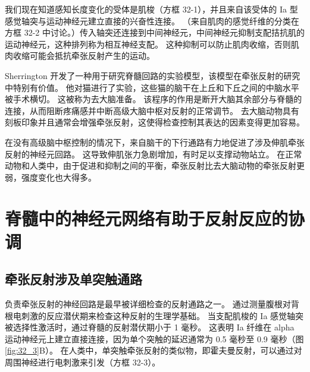 我们现在知道感知长度变化的受体是肌梭（方框 32-1），并且来自该受体的 Ia 型感觉轴突与运动神经元建立直接的兴奋性连接。 
（来自肌肉的感觉纤维的分类在方框 32-2 中讨论。）传入轴突还连接到中间神经元，中间神经元抑制支配拮抗肌的运动神经元，这种排列称为相互神经支配。
这种抑制可以防止肌肉收缩，否则肌肉收缩可能会抵抗牵张反射产生的运动。


Sherrington 开发了一种用于研究脊髓回路的实验模型，该模型在牵张反射的研究中特别有价值。
他对猫进行了实验，这些猫的脑干在上丘和下丘之间的中脑水平被手术横切。
这被称为去大脑准备。
该程序的作用是断开大脑其余部分与脊髓的连接，从而阻断疼痛感并中断高级大脑中枢对反射的正常调节。
去大脑动物具有刻板印象并且通常会增强牵张反射，这使得检查控制其表达的因素变得更加容易。


在没有高级脑中枢控制的情况下，来自脑干的下行通路有力地促进了涉及伸肌牵张反射的神经元回路。
这导致伸肌张力急剧增加，有时足以支撑动物站立。
在正常动物和人类中，由于促进和抑制之间的平衡，牵张反射比去大脑动物的牵张反射更弱，强度变化也大得多。



\section{脊髓中的神经元网络有助于反射反应的协调}

\subsection{牵张反射涉及单突触通路}

负责牵张反射的神经回路是最早被详细检查的反射通路之一。
通过测量腹根对背根电刺激的反应潜伏期来检查这种反射的生理学基础。
当支配肌梭的 Ia 感觉轴突被选择性激活时，通过脊髓的反射潜伏期小于 1 毫秒。 
这表明 Ia 纤维在 alpha 运动神经元上建立直接连接，因为单个突触的延迟通常为 0.5 毫秒至 0.9 毫秒（图 \ref{fig:32_3}B）。 
在人类中，单突触牵张反射的类似物，即霍夫曼反射，可以通过对周围神经进行电刺激来引发（方框 32-3）。

